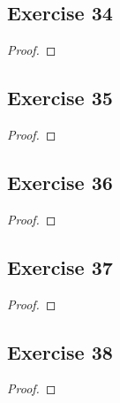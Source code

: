 \documentclass[14pt]{extarticle}
\begin{document}
\subsection{Exercise 34}

\begin{proof}

\end{proof}

\subsection{Exercise 35}

\begin{proof}

\end{proof}

\subsection{Exercise 36}

\begin{proof}

\end{proof}

\subsection{Exercise 37}

\begin{proof}

\end{proof}

\subsection{Exercise 38}

\begin{proof}

\end{proof}
\end{document}

